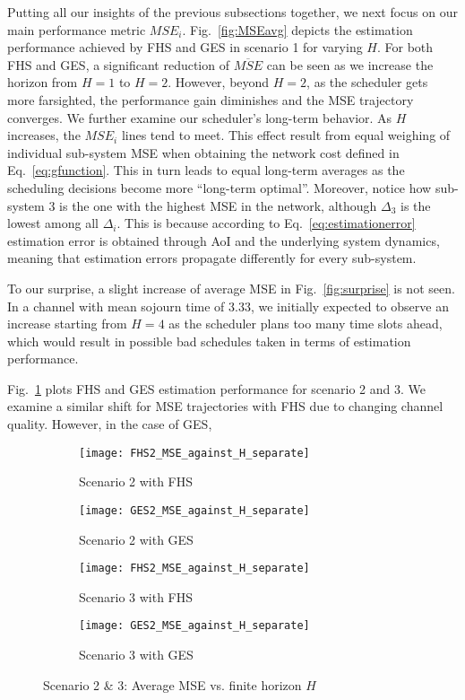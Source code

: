 Putting all our insights of the previous subsections together, we next focus on
our main performance metric $MSE_i$. Fig.~\ref{fig:MSEavg} depicts the
estimation performance achieved by FHS and GES in scenario 1 for varying $H$.
For both FHS and GES, a significant reduction of $\overline{MSE}$ can be seen as
we increase the horizon from $H=1$ to $H=2$. However, beyond $H=2$, as the
scheduler gets more farsighted, the performance gain diminishes and the MSE
trajectory converges. We further examine our scheduler's long-term behavior. As
$H$ increases, the $MSE_i$ lines tend to meet. This effect result from equal
weighing of individual sub-system MSE when obtaining the network cost defined in
Eq.~\eqref{eq:gfunction}. This in turn leads to equal long-term averages as the
scheduling decisions become more ``long-term optimal''. Moreover, notice how
sub-system 3 is the one with the highest MSE in the network, although $\Delta_3$
is the lowest among all $\Delta_i$. This is because according to
Eq.~\ref{eq:estimationerror} estimation error is obtained through AoI and the
underlying system dynamics, meaning that estimation errors propagate differently
for every sub-system.

To our surprise, a slight increase of average MSE in Fig.~\ref{fig:surprise} is
not seen. In a channel with mean sojourn time of 3.33, we initially expected to
observe an increase starting from $H=4$ as the scheduler plans too many time
slots ahead, which would result in possible bad schedules taken in terms of
estimation performance.

Fig.~\ref{fig:MSEavg2} plots FHS and GES estimation performance for scenario 2
and 3. We examine a similar shift for MSE trajectories with FHS due to changing
channel quality. However, in the case of GES, 


\begin{figure}[htb]
  \centering
  \begin{subfigure}[b]{0.49\textwidth}
    \centering
    \texttt{[image: FHS2\_MSE\_against\_H\_separate]}
    \caption{Scenario 2 with FHS}
  \end{subfigure}
  \hfill
  \begin{subfigure}[b]{0.49\textwidth}
    \centering
    \texttt{[image: GES2\_MSE\_against\_H\_separate]}
    \caption{Scenario 2 with GES}
  \end{subfigure}
  \begin{subfigure}[b]{0.49\textwidth}
    \centering
    \texttt{[image: FHS2\_MSE\_against\_H\_separate]}
    \caption{Scenario 3 with FHS}
  \end{subfigure}
  \hfill
  \begin{subfigure}[b]{0.49\textwidth}
    \centering
    \texttt{[image: GES2\_MSE\_against\_H\_separate]}
    \caption{Scenario 3 with GES}
  \end{subfigure}
  \caption{Scenario 2 \& 3: Average MSE vs. finite horizon $H$}
  \label{fig:MSEavg2}
\end{figure}

